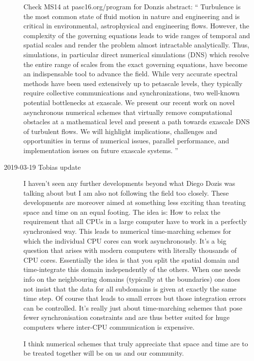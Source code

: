 \begin{description}
Check MS14 at 
{pasc16.org/program} for Donzis abstract:
``
Turbulence is the most common state of fluid motion in nature and
engineering and is critical in environmental, astrophysical and
engineering flows. However, the complexity of the governing equations
leads to wide ranges of temporal and spatial scales and render the
problem almost intractable analytically. Thus, simulations, in particular
direct numerical simulations (DNS) which resolve the entire range of
scales from the exact governing equations, have become an indispensable
tool to advance the field. While very accurate spectral methods have been
used extensively up to petascale levels, they typically require
collective communications and synchronizations, two well-known potential
bottlenecks at exascale. We present our recent work on novel asynchronous
numerical schemes that virtually remove computational obstacles at a
mathematical level and present a path towards exascale DNS of turbulent
flows. We will highlight implications, challenges and opportunities in
terms of numerical issues, parallel performance, and implementation
issues on future exascale systems.
''

\item[2019-03-19 Tobias update]
I haven't seen any further developments beyond what Diego Dozis was
talking about but I am also not following the field too closely. These
developments are moreover aimed at something less exciting than treating
space and time on an equal footing. The idea is: How to relax the
requirement that all CPUs in a large computer have to work in a perfectly
synchronised way. This leads to numerical time-marching schemes for which
the individual CPU cores can work asynchronously. It's a big question
that arises with modern computers with literally thousands of CPU cores.
Essentially the idea is that you split the spatial domain and
time-integrate this domain independently of the others. When one needs
info on the neighbouring domains (typically at the boundaries) one does
not insist that the data for all subdomains is given at exactly the same
time step. Of course that leads to small errors but those integration
errors can be controlled. It's really just about time-marching schemes
that pose fewer synchronisation constraints and are thus better suited
for huge computers where inter-CPU communication is expensive.

I think numerical schemes that truly appreciate that space and time are to be
treated together will be on us and our community.


\end{description}
